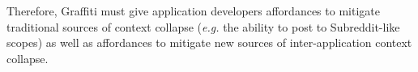 Therefore, Graffiti must give application developers affordances to mitigate traditional sources
of context collapse (\emph{e.g.} the ability to post to Subreddit-like scopes)
as well as affordances to mitigate new sources of inter-application context collapse.







